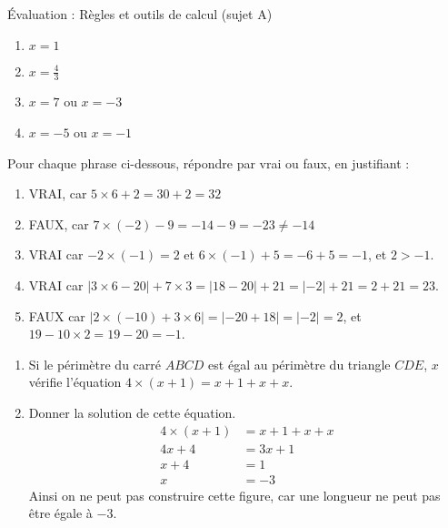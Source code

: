 \documentclass[noheader]{évaluation}
\begin{document}
\begin{center}
	\LARGE Évaluation : Règles et outils de calcul (sujet A)
\end{center}

\begin{exercice}
	\begin{multicols}{2}
		\begin{enumerate}
			\item $x = 1$
			\item $x = \frac{4}{3}$
			\item $x = 7$ ou $x = -3$
			\item $x = -5$ ou $x = -1$
		\end{enumerate}
	\end{multicols}
\end{exercice}

\begin{exercice}
	Pour chaque phrase ci-dessous, répondre par vrai ou faux, en justifiant :
	\begin{enumerate}
		\item VRAI, car $5 × 6 + 2 = 30 + 2 = 32$
		\item FAUX, car $7 × (-2) - 9 = -14 - 9 = -23 ≠ -14$
		\item VRAI car $-2 × (-1) = 2$ et $6 × (-1) + 5 = -6 + 5 = -1$, et $2 > -1$.
		\item VRAI car $|3 × 6 - 20| + 7 × 3 = |18 - 20| + 21 = |{-}2| + 21 = 2 + 21 = 23$.
		\item FAUX car $|2 × (-10) + 3 × 6| = |{-}20 + 18| = |{-}2| = 2$, et $19 - 10 × 2 = 19 - 20 = -1$.
	\end{enumerate}
\end{exercice}

\begin{exercice}
	\begin{enumerate}
		\item Si le périmètre du carré $ABCD$ est égal au périmètre du triangle $CDE$, $x$ vérifie l'équation $4 × (x + 1) = x + 1 + x + x$.
		\item Donner la solution de cette équation.
		      \begin{align*}
			      4 × (x + 1) & = x + 1 + x + x \\
			      4x + 4      & = 3x + 1        \\
			      x + 4       & = 1             \\
			      x           & = -3
		      \end{align*}
		      Ainsi on ne peut pas construire cette figure, car une longueur ne peut pas être égale à $-3$.
	\end{enumerate}
\end{exercice}
\end{document}

